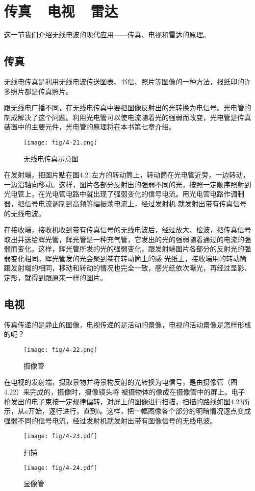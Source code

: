 \section{传真~~电视~~雷达}
这一节我们介绍无线电波的现代应用——传真、电视和雷达的原理。

\subsection{传真}

无线电传真是利用无线电波传送图表、书信、照片等图像的一种方法，报纸印的许多照片都是传真照片。

跟无线电广播不同，在无线电传真中要把图像反射出的光转换为电信号。光电管的制成解决了这个问题。利用光电管可以使电流随着光的强弱而改变，光电管是传真装置中的主要元件，光电管的原理将在本书第七章介绍。
\begin{figure}[htp]\centering
	\texttt{[image: fig/4-21.png]}
	\caption{无线电传真示意图}
	\end{figure}

在发射端，把图片贴在图4.21左方的转动筒上，转动筒在光电管近旁，一边转动，一边沿轴向移动。这样，图片各部分反射出的强弱不同的光，按照一定顺序照射到光电管上，在光电管电路中就出现了强弱变化的信号电流。用光电管电路作调制器，把信号电流调制到高频等幅振荡电流上，经过发射机
就发射出带有传真信号的无线电波。

在接收端，接收机收到带有传真信号的无线电波后，经过放大、检波，把传真信号取出并送给辉光管，辉光管是一种充气管，它发出的光的强弱随着通过的电流的强弱而变化。这样，辉光管所发的光的强弱变化，跟发射端图片各部分的反射光的强弱变化相同。辉光管发的光会聚到卷在转动筒上的感
光纸上，接收端用的转动筒跟发射端的相同，移动和转动的情况也完全一致，感光纸依次曝光，再经过显影、定影，就得到跟原来一样的图片。

\subsection{电视}

传真传递的是静止的图像，电视传递的是活动的景像，电视的活动景像是怎样形成的呢？
\begin{figure}[htp]\centering
	\texttt{[image: fig/4-22.png]}
	\caption{摄像管}
	\end{figure}

在电视的发射端，摄取景物并将景物反射的光转换为电信号，是由摄像管（图4.22）来完成的，摄像时，摄像镜头将
被摄物体的像成在摄像管中的屏上。电子枪发出的电子束按一定规律偏转，对屏上的图像进行扫描，扫描的路线如图4.23所示，从$a$开始，逐行进行，直到$b$。这样，把一幅图像各个部分的明暗情况逐点变成强弱不同的信号电流，经过发射机就发射出带有图像信号的无线电波。
\begin{figure}[htp]
	\centering
	\begin{minipage}[t]{0.48\textwidth}
	\centering
	\texttt{[image: fig/4-23.pdf]}
	\caption{扫描}
	\end{minipage}
	\begin{minipage}[t]{0.48\textwidth}
	\centering
	\texttt{[image: fig/4-24.pdf]}
	\caption{显像管}
	\end{minipage}
	\end{figure}
	
